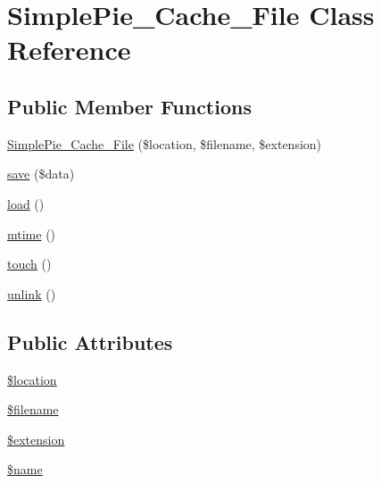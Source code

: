 \hypertarget{class_simple_pie___cache___file}{\section{Simple\-Pie\-\_\-\-Cache\-\_\-\-File Class Reference}
\label{class_simple_pie___cache___file}
}
\subsection*{Public Member Functions}
\begin{DoxyCompactItemize}
\item 
\hyperlink{class_simple_pie___cache___file_ae1d84c80a8144d18b048aa44cb9fe896}{Simple\-Pie\-\_\-\-Cache\-\_\-\-File} (\$location, \$filename, \$extension)
\item 
\hyperlink{class_simple_pie___cache___file_ae7278f8a92b13a46ecbd23cd0062f580}{save} (\$data)
\item 
\hyperlink{class_simple_pie___cache___file_ab97e95c5a809f0de431c4805adcfdf47}{load} ()
\item 
\hyperlink{class_simple_pie___cache___file_a7bb836faa5dda2bae540cc471f54e767}{mtime} ()
\item 
\hyperlink{class_simple_pie___cache___file_a0dc58e0c5e083528cb2da8edb88ebdbb}{touch} ()
\item 
\hyperlink{class_simple_pie___cache___file_af776acebb2cb07307ca29f8885c339c8}{unlink} ()
\end{DoxyCompactItemize}
\subsection*{Public Attributes}
\begin{DoxyCompactItemize}
\item 
\hyperlink{class_simple_pie___cache___file_a029b1cff8970d6b5ac7583edfd7eebfc}{\$location}
\item 
\hyperlink{class_simple_pie___cache___file_ab5834b498927e4e8743f2825b92ead52}{\$filename}
\item 
\hyperlink{class_simple_pie___cache___file_a2628f1d1c5faca94a33734dd8315366a}{\$extension}
\item 
\hyperlink{class_simple_pie___cache___file_a9d2df32134a0be0680ceb63c61e38242}{\$name}
\end{DoxyCompactItemize}


